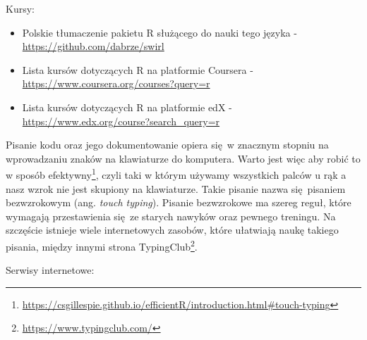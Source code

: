 \documentclass[paper=6in:9in,pagesize=pdftex,headinclude=on,footinclude=on,10pt]{scrbook}
\makeatletter
\DeclareRobustCommand{\href}[2]{#2\footnote{\url{#1}}}
\providecommand{\tightlist}{%
  \setlength{\itemsep}{0pt}\setlength{\parskip}{0pt}}
\newenvironment{kframe}{%
\medskip{}
\setlength{\fboxsep}{.8em}
 \def\at@end@of@kframe{}%
 \ifinner\ifhmode%
  \def\at@end@of@kframe{\end{minipage}}%
  \begin{minipage}{\columnwidth}%
 \fi\fi%
 \def\FrameCommand##1{\hskip\@totalleftmargin \hskip-\fboxsep
 \colorbox{shadecolor}{##1}\hskip-\fboxsep
     \hskip-\linewidth \hskip-\@totalleftmargin \hskip\columnwidth}%
 \MakeFramed {\advance\hsize-\width
   \@totalleftmargin\z@ \linewidth\hsize
   \@setminipage}}%
 {\par\unskip\endMakeFramed%
 \at@end@of@kframe}
\newenvironment{rmdblock}[1]
  {
  \begin{itemize}
  \renewcommand{\labelitemi}{
    \raisebox{-.7\height}[0pt][0pt]{
      {\setkeys{Gin}{width=3em,keepaspectratio}\texttt{[image: images/\#1]}}
    }
  }
  \setlength{\fboxsep}{1em}
  \begin{kframe}
  \item
  }
  {
  \end{kframe}
  \end{itemize}
  }
\newenvironment{rmdinfo}
  {\begin{rmdblock}{compass}}
  {\end{rmdblock}}
\makeatother
\begin{document}
Kursy:

\begin{itemize}
\tightlist
\item
  Polskie tłumaczenie pakietu R służącego do nauki tego języka - \url{https://github.com/dabrze/swirl}
\item
  Lista kursów dotyczących R na platformie Coursera - \url{https://www.coursera.org/courses?query=r}
\item
  Lista kursów dotyczących R na platformie edX - \url{https://www.edx.org/course?search_query=r}
\end{itemize}

\begin{rmdinfo}
\begin{rmdinfo}

Pisanie kodu oraz jego dokumentowanie opiera się~w znacznym stopniu na wprowadzaniu znaków na klawiaturze do komputera.
Warto jest więc aby robić to w sposób \href{https://csgillespie.github.io/efficientR/introduction.html\#touch-typing}{efektywny}, czyli taki w którym używamy wszystkich palców u rąk a nasz wzrok nie jest skupiony na klawiaturze.
Takie pisanie nazwa się~pisaniem bezwzrokowym (ang. \emph{touch typing}).
Pisanie bezwzrokowe ma szereg reguł, które wymagają przestawienia się~ze starych nawyków oraz pewnego treningu.
Na szczęście istnieje wiele internetowych zasobów, które ułatwiają naukę takiego pisania, między innymi strona \href{https://www.typingclub.com/}{TypingClub}.

\end{rmdinfo}
\end{rmdinfo}

Serwisy internetowe:
\end{document}
